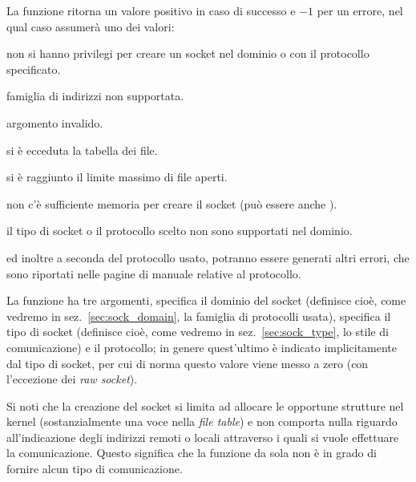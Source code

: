 \begin{funcproto}{
}

{La funzione ritorna un valore positivo in caso di successo e $-1$ per un
  errore, nel qual caso  assumerà uno dei valori:
  \begin{errlist}
  \item[\errcode{EACCES}] non si hanno privilegi per creare un socket nel
    dominio o con il protocollo specificato.
  \item[\errcode{EAFNOSUPPORT}] famiglia di indirizzi non supportata.
  \item[\errcode{EINVAL}] argomento  invalido.
  \item[\errcode{EMFILE}] si è ecceduta la tabella dei file.
  \item[\errcode{ENFILE}] si è raggiunto il limite massimo di file aperti.
  \item[\errcode{ENOBUFS}] non c'è sufficiente memoria per creare il socket
    (può essere anche ).
  \item[\errcode{EPROTONOSUPPORT}] il tipo di socket o il protocollo scelto
    non sono supportati nel dominio.
  \end{errlist}
  ed inoltre a seconda del protocollo usato, potranno essere generati altri
  errori, che sono riportati nelle pagine di manuale relative al protocollo.}
\end{funcproto}


La funzione ha tre argomenti,  specifica il dominio del socket
(definisce cioè, come vedremo in sez.~\ref{sec:sock_domain}, la famiglia di
protocolli usata),  specifica il tipo di socket (definisce cioè,
come vedremo in sez.~\ref{sec:sock_type}, lo stile di comunicazione) e
 il protocollo; in genere quest'ultimo è indicato
implicitamente dal tipo di socket, per cui di norma questo valore viene messo
a zero (con l'eccezione dei \textit{raw socket}).


Si noti che la creazione del socket si limita ad allocare le opportune
strutture nel kernel (sostanzialmente una voce nella \textit{file table}) e
non comporta nulla riguardo all'indicazione degli indirizzi remoti o locali
attraverso i quali si vuole effettuare la comunicazione. Questo significa che
la funzione da sola non è in grado di fornire alcun tipo di comunicazione. 


